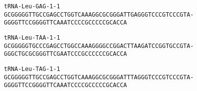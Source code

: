 \documentclass{article}
\newcommand{\rnabox}[1]{\colorbox{#1}{\texttt{#1}}}
\begin{document}
\vspace{-0.5mm}

\texttt{tRNA-Leu-GAG-1-1}
\rnabox{G}\rnabox{C}\rnabox{G}\rnabox{G}\rnabox{G}\rnabox{G}\rnabox{G}\rnabox{T}\rnabox{T}\rnabox{G}\rnabox{C}\rnabox{C}\rnabox{G}\rnabox{A}\rnabox{G}\rnabox{C}\rnabox{C}\rnabox{T}\rnabox{G}\rnabox{G}\rnabox{T}\rnabox{C}\rnabox{A}\rnabox{A}\rnabox{A}\rnabox{G}\rnabox{G}\rnabox{C}\rnabox{G}\rnabox{C}\rnabox{G}\rnabox{G}\rnabox{G}\rnabox{A}\rnabox{T}\rnabox{T}\rnabox{G}\rnabox{A}\rnabox{G}\rnabox{G}\rnabox{G}\rnabox{T}\rnabox{C}\rnabox{C}\rnabox{C}\rnabox{G}\rnabox{T}\rnabox{C}\rnabox{C}\rnabox{C}\rnabox{G}\rnabox{T}\rnabox{A}\rnabox{-}\rnabox{G}\rnabox{G}\rnabox{G}\rnabox{G}\rnabox{T}\rnabox{T}\rnabox{C}\rnabox{C}\rnabox{G}\rnabox{G}\rnabox{G}\rnabox{G}\rnabox{T}\rnabox{T}\rnabox{C}\rnabox{A}\rnabox{A}\rnabox{A}\rnabox{T}\rnabox{C}\rnabox{C}\rnabox{C}\rnabox{C}\rnabox{G}\rnabox{C}\rnabox{C}\rnabox{C}\rnabox{C}\rnabox{C}\rnabox{G}\rnabox{C}\rnabox{A}\rnabox{C}\rnabox{C}\rnabox{A}

\vspace{-0.5mm}

\texttt{tRNA-Leu-TAA-1-1}
\rnabox{G}\rnabox{C}\rnabox{G}\rnabox{G}\rnabox{G}\rnabox{G}\rnabox{G}\rnabox{T}\rnabox{G}\rnabox{C}\rnabox{C}\rnabox{C}\rnabox{G}\rnabox{A}\rnabox{G}\rnabox{C}\rnabox{C}\rnabox{T}\rnabox{G}\rnabox{G}\rnabox{C}\rnabox{C}\rnabox{A}\rnabox{A}\rnabox{A}\rnabox{G}\rnabox{G}\rnabox{G}\rnabox{G}\rnabox{C}\rnabox{C}\rnabox{G}\rnabox{G}\rnabox{A}\rnabox{C}\rnabox{T}\rnabox{T}\rnabox{A}\rnabox{A}\rnabox{G}\rnabox{A}\rnabox{T}\rnabox{C}\rnabox{C}\rnabox{G}\rnabox{G}\rnabox{T}\rnabox{G}\rnabox{C}\rnabox{C}\rnabox{G}\rnabox{T}\rnabox{A}\rnabox{-}\rnabox{G}\rnabox{G}\rnabox{G}\rnabox{C}\rnabox{T}\rnabox{G}\rnabox{C}\rnabox{G}\rnabox{C}\rnabox{G}\rnabox{G}\rnabox{G}\rnabox{T}\rnabox{T}\rnabox{C}\rnabox{G}\rnabox{A}\rnabox{A}\rnabox{T}\rnabox{C}\rnabox{C}\rnabox{C}\rnabox{G}\rnabox{C}\rnabox{C}\rnabox{C}\rnabox{C}\rnabox{C}\rnabox{C}\rnabox{G}\rnabox{C}\rnabox{A}\rnabox{C}\rnabox{C}\rnabox{A}

\vspace{-0.5mm}

\texttt{tRNA-Leu-TAG-1-1}
\rnabox{G}\rnabox{C}\rnabox{G}\rnabox{G}\rnabox{G}\rnabox{G}\rnabox{G}\rnabox{T}\rnabox{T}\rnabox{G}\rnabox{C}\rnabox{C}\rnabox{G}\rnabox{A}\rnabox{G}\rnabox{C}\rnabox{C}\rnabox{T}\rnabox{G}\rnabox{G}\rnabox{T}\rnabox{C}\rnabox{A}\rnabox{A}\rnabox{A}\rnabox{G}\rnabox{G}\rnabox{C}\rnabox{G}\rnabox{C}\rnabox{G}\rnabox{G}\rnabox{G}\rnabox{A}\rnabox{T}\rnabox{T}\rnabox{T}\rnabox{A}\rnabox{G}\rnabox{G}\rnabox{G}\rnabox{T}\rnabox{C}\rnabox{C}\rnabox{C}\rnabox{G}\rnabox{T}\rnabox{C}\rnabox{C}\rnabox{C}\rnabox{G}\rnabox{T}\rnabox{A}\rnabox{-}\rnabox{G}\rnabox{G}\rnabox{G}\rnabox{G}\rnabox{T}\rnabox{T}\rnabox{C}\rnabox{C}\rnabox{G}\rnabox{G}\rnabox{G}\rnabox{G}\rnabox{T}\rnabox{T}\rnabox{C}\rnabox{A}\rnabox{A}\rnabox{A}\rnabox{T}\rnabox{C}\rnabox{C}\rnabox{C}\rnabox{C}\rnabox{G}\rnabox{C}\rnabox{C}\rnabox{C}\rnabox{C}\rnabox{C}\rnabox{G}\rnabox{C}\rnabox{A}\rnabox{C}\rnabox{C}\rnabox{A}
\end{document}
